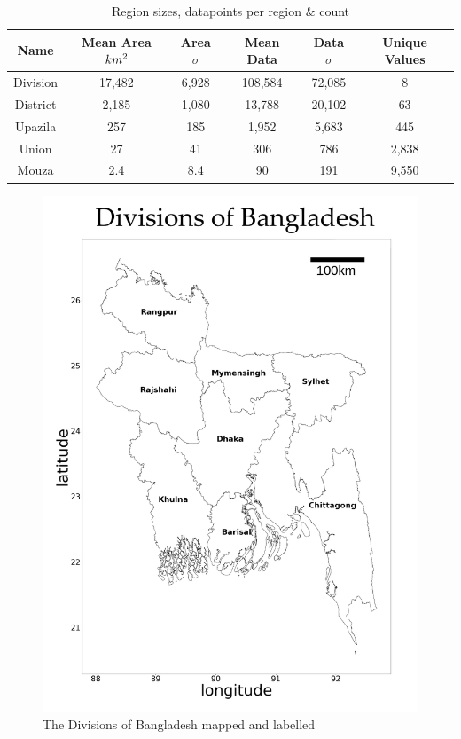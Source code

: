 \begin{table}
    \centering
    \begin{tabular}{c c c c c c} 
         \toprule
         Name & Mean Area $km\textsuperscript{2}$ & Area $\sigma$ & Mean Data & Data $\sigma$ & Unique Values \\ 
         \midrule 
         Division & 17,482 & 6,928 & 108,584 & 72,085 & 8 \\ 
         District & 2,185 & 1,080 & 13,788 & 20,102 & 63 \\
         Upazila & 257 & 185 & 1,952 & 5,683 & 445 \\
         Union & 27 & 41 & 306 & 786 & 2,838 \\
         Mouza & 2.4 & 8.4 & 90 & 191 & 9,550 \\
         \bottomrule
    \end{tabular}
    \caption{Region sizes, datapoints per region \& count}
    \label{tbl:x reg_size_dp}
\end{table}

\begin{figure}
    \centering
    \includegraphics[scale=0.45]{figures/labelled_divisions.png} 
    \caption{The Divisions of Bangladesh mapped and labelled}
    \label{fig:x labelled_divisions}
\end{figure}

